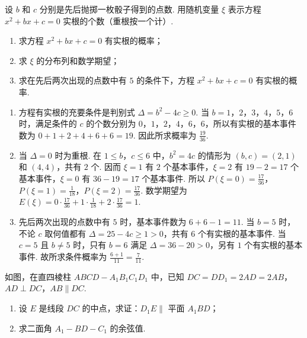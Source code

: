 \begin{problem}
设 \(b\) 和 \(c\) 分别是先后抛掷一枚骰子得到的点数. 用随机变量 \(\xi\) 表示方程 \(x^{2} + bx + c = 0\) 实根的个数（重根按一个计）.

\begin{enumerate}
\item 求方程 \( x^{2} + bx + c = 0 \) 有实根的概率；
\item 求 \( \xi \) 的分布列和数学期望；
\item 求在先后两次出现的点数中有 \(5\) 的条件下，方程 \(x^{2} + bx + c = 0\) 有实根的概率.
\end{enumerate}
\end{problem}

\begin{solution}
\begin{enumerate}
\item 方程有实根的充要条件是判别式 \(\Delta=b^2-4c\geqslant0\). 当 \(b=1\)，\(2\)，\(3\)，\(4\)，\(5\)，\(6\) 时，满足条件的 \(c\) 的个数分别为 \(0\)，\(1\)，\(2\)，\(4\)，\(6\)，\(6\)，所以有实根的基本事件数为 \(0+1+2+4+6+6=19\). 因此所求概率为 \(\frac{19}{36}\).
\item 当 \(\Delta=0\) 时为重根. 在 \(1\leqslant b\)，\(c\leqslant6\) 中，\(b^2=4c\) 的情形为 \((b,c)=(2,1)\) 和 \((4,4)\)，共有 \(2\) 个. 因而 \(\xi=1\) 有 \(2\) 个基本事件，\(\xi=2\) 有 \(19-2=17\) 个基本事件，\(\xi=0\) 有 \(36-19=17\) 个基本事件. 所以
\(P(\xi=0)=\frac{17}{36}\)，\(P(\xi=1)=\frac{1}{18}\)，\(P(\xi=2)=\frac{17}{36}\).
数学期望为 \(E(\xi)=0\cdot\frac{17}{36}+1\cdot\frac{1}{18}+2\cdot\frac{17}{36}=1\).
\item 先后两次出现的点数中有 \(5\) 时，基本事件数为 \(6+6-1=11\). 当 \(b=5\) 时，不论 \(c\) 取何值都有 \(\Delta=25-4c\geqslant1>0\)，共有 \(6\) 个有实根的基本事件. 当 \(c=5\) 且 \(b\neq5\) 时，只有 \(b=6\) 满足 \(\Delta=36-20>0\)，另有 \(1\) 个有实根的基本事件. 故所求条件概率为 \(\frac{6+1}{11}=\frac{7}{11}\).
\end{enumerate}
\end{solution}

\begin{problem}
如图，在直四棱柱 \(ABCD - A_{1}B_{1}C_{1}D_{1}\) 中，已知 \(DC = DD_{1} = 2AD = 2AB\)，\(AD \perp DC\)，\(AB \parallel DC\).

\begin{enumerate}
\item 设 \(E\) 是线段 \(DC\) 的中点，求证：\( D_{1}E \parallel \) 平面 \(A_{1}BD\)；
\item 求二面角 \( A_{1}-BD-C_{1} \) 的余弦值.
\end{enumerate}

\end{problem}


